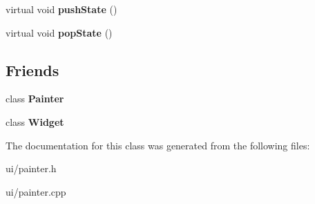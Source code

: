 \begin{DoxyCompactItemize}
\item 
\hypertarget{class_tempest_1_1_painter_device_a283d0e7e26b3858ff7657fc37420176a}{virtual void {\bfseries push\+State} ()}\label{class_tempest_1_1_painter_device_a283d0e7e26b3858ff7657fc37420176a}

\item 
\hypertarget{class_tempest_1_1_painter_device_acb40a33ced8bd961722deedb0ed2566b}{virtual void {\bfseries pop\+State} ()}\label{class_tempest_1_1_painter_device_acb40a33ced8bd961722deedb0ed2566b}

\end{DoxyCompactItemize}
\subsection*{Friends}
\begin{DoxyCompactItemize}
\item 
\hypertarget{class_tempest_1_1_painter_device_a1f99da50084e20c61c6666e004378dd3}{class {\bfseries Painter}}\label{class_tempest_1_1_painter_device_a1f99da50084e20c61c6666e004378dd3}

\item 
\hypertarget{class_tempest_1_1_painter_device_a29fa75ce3911bef8c5f4414f6f0242b8}{class {\bfseries Widget}}\label{class_tempest_1_1_painter_device_a29fa75ce3911bef8c5f4414f6f0242b8}

\end{DoxyCompactItemize}


The documentation for this class was generated from the following files\+:\begin{DoxyCompactItemize}
\item 
ui/painter.\+h\item 
ui/painter.\+cpp\end{DoxyCompactItemize}

